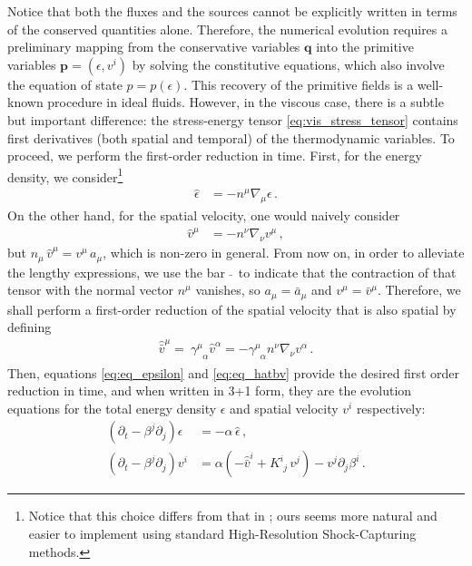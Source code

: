 \documentclass[prd,aps,twocolumn,floats,floatfix,nofootinbib,superscriptaddress] {revtex4-1}
\begin{document}
Notice that both the fluxes and the sources cannot be explicitly written in terms of the conserved quantities alone. Therefore, the numerical evolution requires a preliminary mapping from the conservative variables $\mathbf{q}$ into the primitive variables $\mathbf{p}=(\epsilon,v^{i})$ by solving the constitutive equations, which also involve the equation of state $p=p(\epsilon)$. This recovery of the primitive fields is a well-known procedure in ideal fluids. However, in the viscous case, there is a subtle but important difference: the stress-energy tensor \eqref{eq:vis_stress_tensor} contains first derivatives (both spatial and temporal) of the thermodynamic variables. 
%
To proceed, we perform the first-order reduction in time. First, for the energy density, we consider\footnote{Notice that this choice differs from that in \cite{Pandya:2022pif}; ours seems more natural and easier to implement using standard High-Resolution Shock-Capturing methods.}
\begin{align}
\hat\epsilon &= -n^\mu\nabla_\mu\epsilon\,. \label{eq:eq_epsilon}
\end{align}
On the other hand, for the spatial velocity, one would naively consider
\begin{align}
\hat v^{\mu} &=-n^\nu\nabla_\nu v^\mu\,, \label{eq:eq_hat_v}
\end{align}
but $n_\mu\,\hat v^\mu = v^\mu\,a_\mu$, which is non-zero in general. From now on, in order to alleviate the lengthy expressions, we use the bar $\bar\,\,$ to indicate that the contraction of that tensor with the normal vector $n^\mu$ vanishes, so $a_\mu=\bar a_\mu$ and $v^{\mu}=\bar v^{\mu}$.  Therefore, we shall perform a first-order reduction of the spatial velocity that is also spatial by defining
\begin{align}
        \hat{\bar v}^\mu=~\gamma^\mu_{\phantom{\mu}\alpha} \hat v^\alpha 
=-\gamma^\mu_{\phantom{\mu}\alpha}n^\nu\nabla_\nu v^\alpha\,.
    \label{eq:eq_hatbv}
\end{align}
Then, equations \eqref{eq:eq_epsilon} and \eqref{eq:eq_hatbv} provide the desired first order reduction in time, and when written in 3+1 form, they are the evolution equations for the total energy density $\epsilon$ and spatial velocity $v^i$ respectively:
\begin{align}
(\partial_t-\beta^j\partial_j)\epsilon &=-\alpha\,\hat\epsilon\,, \label{eq:evolution_epsilon}\\
(\partial_t-\beta^j\partial_j)v^i &=\alpha(-\hat{\bar v}^i+K^i_{\phantom{i}j}\,v^j)-v^j\partial_j\beta^i\,. \label{eq:evolution_v}
\end{align}
\end{document}
